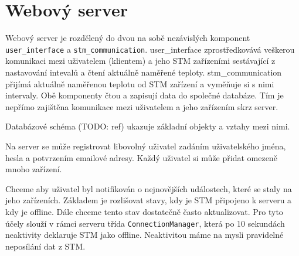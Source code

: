
\section{Webový server}


Webový server je rozdělený do dvou na sobě nezávislých komponent \texttt{user\_interface} a
\texttt{stm\_communication}.
user_interface zprostředkovává veškerou komunikaci mezi uživatelem (klientem) a jeho STM
zařízeními sestávající z nastavování intevalů a čtení aktuálně naměřené teploty.
stm_communication přijímá aktuálně naměřenou teplotu od STM zařízení a vyměňuje si s nimi intervaly.
Obě komponenty čtou a zapisují data do společné databáze.
Tím je nepřímo zajištěna komunikace mezi uživatelem a jeho zařízením skrz server.


Databázové schéma (TODO: ref) ukazuje základní objekty a vztahy mezi nimi.

Na server se může registrovat libovolný uživatel zadáním uživatelského jména, hesla a potvrzením
emailové adresy.
Každý uživatel si může přidat omezeně mnoho zařízení.

Chceme aby uživatel byl notifikován o nejnovějších událostech, které se staly na jeho zařízeních.
Základem je rozlišovat stavy, kdy je STM připojeno k serveru a kdy je offline.
Dále chceme tento stav dostatečně často aktualizovat.
Pro tyto účely slouží v rámci serveru třída \texttt{ConnectionManager}, která po 10 sekundách
neaktivity deklaruje STM jako offline.
Neaktivitou máme na mysli pravidelné neposílání dat z STM.


